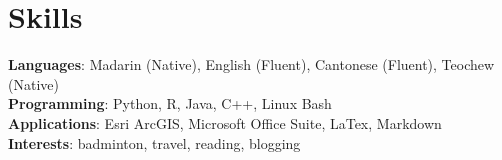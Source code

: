 \documentclass[A4,11pt]{article}
\begin{document}
\section{Skills}
 \begin{itemize}[leftmargin=0.5cm, label={}]
    \small{\item{
     \textbf{Languages}{: Madarin (Native), English (Fluent), Cantonese (Fluent), Teochew (Native)} \\
     \textbf{Programming}{: Python, R, Java, C++, Linux Bash} \\
     \textbf{Applications}{: Esri ArcGIS, Microsoft Office Suite, LaTex, Markdown} \\
     \textbf{Interests}{: badminton, travel, reading, blogging} \\
    }}
 \end{itemize}
    
\end{document}
